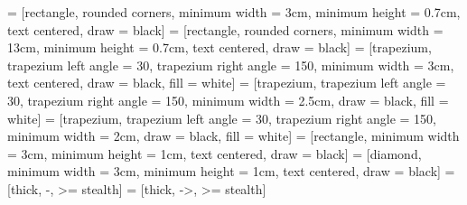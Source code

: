 \documentclass{ctexart}
\begin{document}
\pagestyle{empty}

 = [rectangle, rounded corners, minimum width = 3cm, minimum height = 0.7cm, text centered, draw = black]
 = [rectangle, rounded corners, minimum width = 13cm, minimum height = 0.7cm, text centered, draw = black]
 = [trapezium, trapezium left angle = 30, trapezium right angle = 150, minimum width = 3cm, text centered, draw = black, fill = white]
 = [trapezium, trapezium left angle = 30, trapezium right angle = 150, minimum width = 2.5cm, draw = black, fill = white]
 = [trapezium, trapezium left angle = 30, trapezium right angle = 150, minimum width = 2cm, draw = black, fill = white]
 = [rectangle, minimum width = 3cm, minimum height = 1cm, text centered, draw = black]
 = [diamond, minimum width = 3cm, minimum height = 1cm, text centered, draw = black]
 = [thick, -, >= stealth]
 = [thick, ->, >= stealth]
\end{document}
